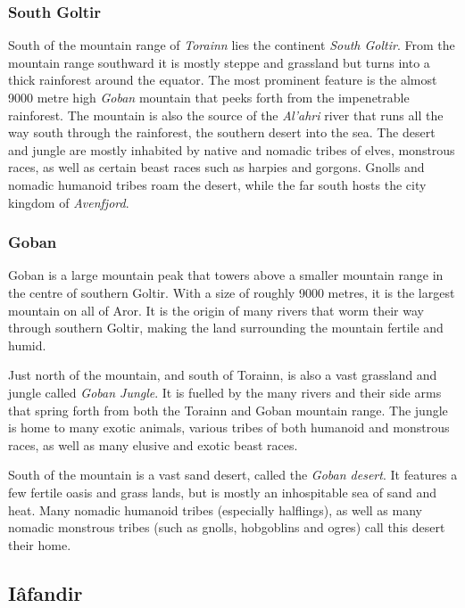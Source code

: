 \subsubsection{South Goltir}
\label{sec:South Goltir}

South of the mountain range of \emph{Torainn} lies the continent \emph{South
  Goltir}. From the mountain range southward it is mostly steppe and grassland
but turns into a thick rainforest around the equator. The most prominent
feature is the almost 9000 metre high \emph{Goban} mountain that peeks forth
from the impenetrable rainforest. The mountain is also the source of the
\emph{Al'ahri} river that runs all the way south through the rainforest, the
southern desert into the sea. The desert and jungle are mostly inhabited by
native and nomadic tribes of elves, monstrous races, as well as certain beast
races such as harpies and gorgons. Gnolls and nomadic humanoid tribes roam the
desert, while the far south hosts the city kingdom of \emph{Avenfjord}.

\subsubsection{Goban}
\label{sec:Goban}

Goban is a large mountain peak that towers above a smaller mountain range in
the centre of southern Goltir. With a size of roughly 9000 metres, it is the
largest mountain on all of Aror. It is the origin of many rivers that worm
their way through southern Goltir, making the land surrounding the mountain
fertile and humid.

Just north of the mountain, and south of Torainn, is also a vast grassland and
jungle called \emph{Goban Jungle}. It is fuelled by the many rivers and their
side arms that spring forth from both the Torainn and Goban mountain range.
The jungle is home to many exotic animals, various tribes of both humanoid and
monstrous races, as well as many elusive and exotic beast races.

South of the mountain is a vast sand desert, called the \emph{Goban desert}.
It features a few fertile oasis and grass lands, but is mostly an inhospitable
sea of sand and heat. Many nomadic humanoid tribes (especially halflings), as
well as many nomadic monstrous tribes (such as gnolls, hobgoblins and ogres)
call this desert their home.

\subsection{Iâfandir}
\label{sec:Iafandir}

